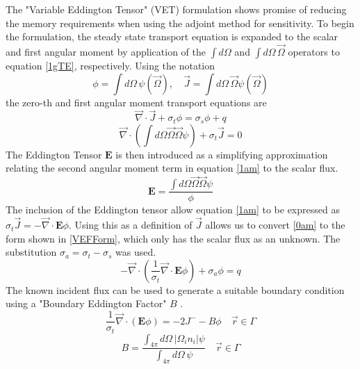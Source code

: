 \documentclass{article}
\newcommand{\vr}{\vec{r}}
\newcommand{\vO}{\vec{\Omega}}
\newcommand{\vdiv}{\vec{\nabla} \cdot}
\newcommand{\Edd}{\mathbf{E}}
\newcommand{\sigt}{\sigma_t}
\newcommand{\sigs}{\sigma_s}
\newcommand{\siga}{\sigma_a}
\newcommand{\scalSource}{q}
\begin{document}
The "Variable Eddington Tensor" (VET) formulation shows promise of reducing the memory requirements when using the adjoint method for sensitivity. To begin the formulation, the steady state transport equation is expanded to the scalar and first angular moment by application of the $\int d \Omega$ and $\int d \Omega \, \vO$ operators to equation \ref{1gTE}, respectively. Using the notation
\begin{equation}
\phi=\int d\Omega \, \psi( \vO )
,\quad
\vec{J}= \int d\Omega \, \vO \psi( \vO )
\end{equation}
the zero-th and first angular moment transport equations are
\begin{equation}
\label{0am}
\vdiv \vec{J} + \sigt \phi = \sigs \phi + \scalSource
\end{equation}
\begin{equation}
\label{1am}
\vdiv \left(  \int d\Omega \vO \vO \psi \right) + \sigt \vec{J} =0 
\end{equation}
The Eddington Tensor $\Edd$ is then introduced as a simplifying approximation relating the second angular moment term in equation \ref{1am} to the scalar flux. 
\begin{equation}
\label{EddDef}
\Edd=\frac{\int d\Omega \vO \vO \psi}{\phi}
\end{equation}
The inclusion of the Eddington tensor allow equation \ref{1am} to be expressed as $\sigt \vec{J} = - \vdiv \Edd \phi$. Using this as a definition of $\vec{J}$ allows us to convert \ref{0am} to the form shown in \ref{VEFForm}, which only has the scalar flux as an unknown. The substitution $\siga = \sigt-\sigs$ was used.
\begin{equation}
\label{VEFForm}
- \vdiv \left( \frac{1}{\sigt}\vdiv \Edd \phi \right) + \siga \phi = \scalSource
\end{equation}
The known incident flux can be used to generate a suitable boundary condition using a "Boundary Eddington Factor" $B$ \cite{Miften}.
\begin{equation}
\frac{1}{\sigma_{t} } \vec{\nabla} \cdot \left(\Edd \phi \right)  = - 2J^- - B \phi \quad \vr \in \Gamma
\end{equation}
\begin{equation}
B= \frac{\int_{4 \pi} d\Omega \, \left| \Omega_i n_i \right | \psi}{\int_{4\pi} d\Omega \, \psi} \quad \vr \in \Gamma
\end{equation}

\end{document}
